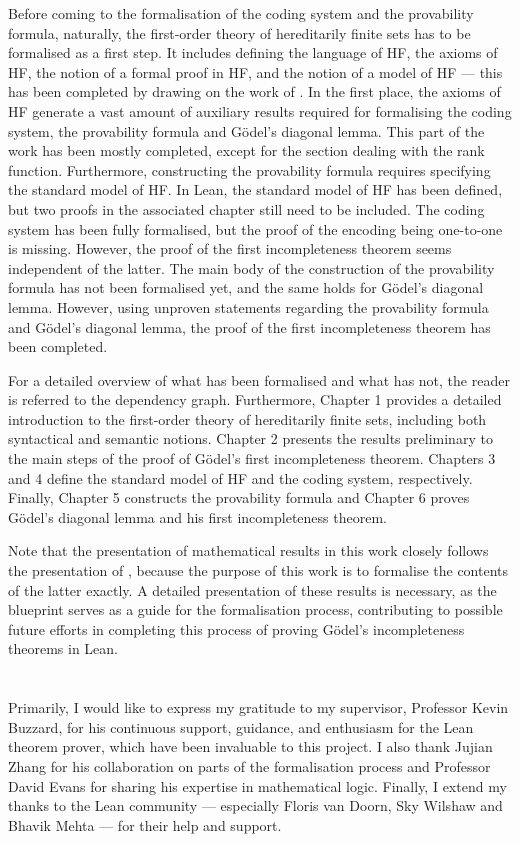 Before coming to the formalisation of the coding system and the provability formula, naturally, 
the first-order theory of hereditarily finite sets has to be formalised as a first step.
It includes defining the language of HF, the axioms of HF, the notion of a formal proof in HF,
and the notion of a model of HF — this has been completed by drawing on the work of
\cite{han2020formal}.
In the first place, the axioms of HF generate a vast amount of auxiliary results required for 
formalising the coding system, the provability formula and Gödel's diagonal lemma. 
This part of the work has been mostly completed, 
except for the section dealing with the rank function.
Furthermore, constructing the provability formula requires specifying the standard model of HF.
In Lean, the standard model of HF has been defined, but two proofs in the associated chapter
still need to be included.
The coding system has been fully formalised, but the proof of the encoding being one-to-one
is missing. However, the proof of the first incompleteness theorem seems independent of the
latter.
The main body of the construction of the provability formula has not been formalised yet,
and the same holds for Gödel's diagonal lemma.
However, using unproven statements regarding the provability formula and Gödel's diagonal lemma, 
the proof of the first incompleteness theorem has been completed. 

For a detailed overview of what has been formalised and what has not, 
the reader is referred to the dependency graph.
Furthermore, 
Chapter 1 provides a detailed introduction to the first-order theory of hereditarily finite sets,
including both syntactical and semantic notions.
Chapter 2 presents the results preliminary to the main steps of the proof of Gödel's first
incompleteness theorem.
Chapters 3 and 4 define the standard model of HF and the coding system, respectively.
Finally, Chapter 5 constructs the provability formula and Chapter 6
proves Gödel's diagonal lemma and his first incompleteness theorem.

Note that the presentation of mathematical results in this work closely follows the presentation of  
\cite{swierczkowski2003finite}, because the purpose of this work is to formalise 
the contents of the latter exactly.
A detailed presentation of these results is necessary, 
as the blueprint serves as a guide for the formalisation process, 
contributing to possible future efforts in completing this process of proving
Gödel's incompleteness theorems in Lean.\\\\

\\

\noindent Primarily, I would like to express my gratitude to my supervisor, Professor Kevin Buzzard, 
for his continuous support, guidance, and enthusiasm for the Lean theorem prover, 
which have been invaluable to this project.
I also thank Jujian Zhang for his collaboration on parts of the formalisation process and 
Professor David Evans for sharing his expertise in mathematical logic. 
Finally, I extend my thanks to the Lean community — especially Floris van Doorn, Sky Wilshaw and 
Bhavik Mehta — for their help and support.


